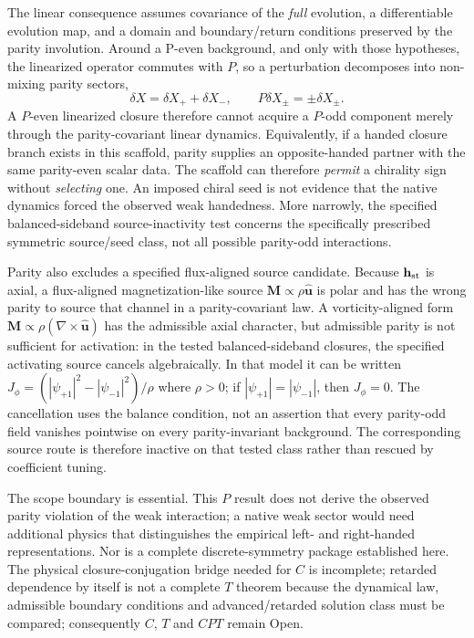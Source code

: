 \documentclass[11pt]{article}
\theoremstyle{definition}
\begin{document}
The linear consequence assumes covariance of the \emph{full} evolution,
a differentiable evolution map, and a domain and boundary/return conditions
preserved by the parity involution.  Around a P-even background, and only
with those hypotheses, the linearized operator commutes with $P$, so a perturbation decomposes into non-mixing parity sectors,
\begin{equation}
 \delta X=\delta X_{+}+\delta X_{-},
 \qquad
 P\delta X_{\pm}=\pm\delta X_{\pm}.
 \label{eq:parity_blocks}
\end{equation}
A $P$-even linearized closure therefore cannot acquire a $P$-odd component merely through the parity-covariant linear dynamics.  Equivalently, if a handed closure branch exists in this scaffold, parity supplies an opposite-handed partner with the same parity-even scalar data.  The scaffold can therefore \emph{permit} a chirality sign without \emph{selecting} one.  An imposed chiral seed is not evidence that the native dynamics forced the observed weak handedness.  More narrowly, the specified balanced-sideband source-inactivity test concerns the specifically prescribed symmetric source/seed class, not all possible parity-odd interactions.

Parity also excludes a specified flux-aligned source candidate.  Because $\mathbf h_{\rm st}$ is axial, a flux-aligned magnetization-like source $\mathbf M\propto\rho\hat{\mathbf u}$ is polar and has the wrong parity to source that channel in a parity-covariant law.  A vorticity-aligned form $\mathbf M\propto\rho(\nabla\times\hat{\mathbf u})$ has the admissible axial character, but admissible parity is not sufficient for activation: in the tested balanced-sideband closures, the specified activating source cancels algebraically.  In that model it can be written $J_\phi=(|\psi_{+1}|^2-|\psi_{-1}|^2)/\rho$ where $\rho>0$; if $|\psi_{+1}|=|\psi_{-1}|$, then $J_\phi=0$.  The cancellation uses the balance condition, not an assertion that every parity-odd field vanishes pointwise on every parity-invariant background.  The corresponding source route is therefore inactive on that tested class rather than rescued by coefficient tuning.

The scope boundary is essential.  This $P$ result does not derive the observed parity violation of the weak interaction; a native weak sector would need additional physics that distinguishes the empirical left- and right-handed representations.  Nor is a complete discrete-symmetry package established here.  The physical closure-conjugation bridge needed for $C$ is incomplete; retarded dependence by itself is not a complete $T$ theorem because the dynamical law, admissible boundary conditions and advanced/retarded solution class must be compared; consequently $C$, $T$ and $CPT$ remain Open.
\end{document}
